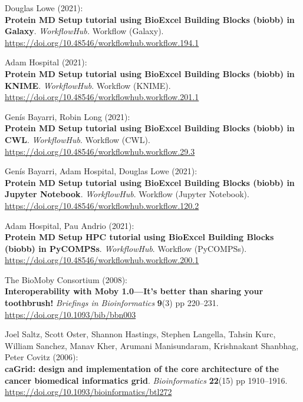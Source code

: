 \begin{thebibliography}{9}
 Douglas Lowe (2021):\\
\textbf{Protein MD Setup tutorial using BioExcel Building Blocks (biobb)
in Galaxy}. \emph{WorkflowHub.} Workflow (Galaxy).\\
\url{https://doi.org/10.48546/workflowhub.workflow.194.1}

 Adam Hospital (2021):\\
\textbf{Protein MD Setup tutorial using BioExcel Building Blocks (biobb)
in KNIME}. \emph{WorkflowHub}. Workflow (KNIME).\\
\url{https://doi.org/10.48546/workflowhub.workflow.201.1}

 Genís Bayarri, Robin Long (2021):\\
\textbf{Protein MD Setup tutorial using BioExcel Building Blocks (biobb)
in CWL}. \emph{WorkflowHub}. Workflow (CWL).\\
\url{https://doi.org/10.48546/workflowhub.workflow.29.3}

 Genís Bayarri, Adam Hospital, Douglas Lowe (2021):\\
\textbf{Protein MD Setup tutorial using BioExcel Building Blocks (biobb)
in Jupyter Notebook}. \emph{WorkflowHub}. Workflow (Jupyter Notebook).\\
\url{https://doi.org/10.48546/workflowhub.workflow.120.2}

 Adam Hospital, Pau Andrio (2021):\\
\textbf{Protein MD Setup HPC tutorial using BioExcel Building Blocks
(biobb) in PyCOMPSs}. \emph{WorkflowHub}. Workflow (PyCOMPSs).\\
\url{https://doi.org/10.48546/workflowhub.workflow.200.1}

 The BioMoby Consortium (2008):\\
\textbf{Interoperability with Moby 1.0---It's better than sharing your
toothbrush!} \emph{Briefings in Bioinformatics} \textbf{9}(3) pp
220--231.\\
\url{https://doi.org/10.1093/bib/bbn003}

 Joel Saltz, Scott Oster, Shannon Hastings, Stephen Langella,
Tahsin Kurc, William Sanchez, Manav Kher, Arumani Manisundaram,
Krishnakant Shanbhag, Peter Covitz (2006):\\
\textbf{caGrid: design and implementation of the core architecture of
the cancer biomedical informatics grid}. \emph{Bioinformatics}
\textbf{22}(15) pp 1910--1916.\\
\url{https://doi.org/10.1093/bioinformatics/btl272}


\end{thebibliography}
